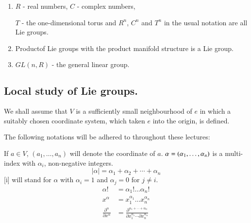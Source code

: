 \begin{enumerate}
\renewcommand{\labelenumi}{(\theenumi)}
\item  $R$ - real numbers, $C$ - complex numbers,

$T$ - the one-dimensional torus and $R^n$, $C^n$ and $T^n$ in the
  usual notation are all Lie groups. 

\item  Product\pageoriginale of Lie groups with the product manifold
  structure is a Lie group. 

\item  $GL(n, R)$ - the general linear group.
\end{enumerate}

\subsection{Local study of Lie groups.}\label{chap2-sec2.2}%

We shall assume that $V$ is a sufficiently small neighbourhood of $e$
in which a suitably chosen coordinate system, which taken $e$ into the
origin, is defined. 

The following notations will be adhered to throughout these lectures:

If $a \in V$, $(a_1,\ldots,a_n)$ will denote the coordinate of
$a$. $\alpha =(\alpha_1,\ldots,\break\alpha_n)$ is a multi-index with
$\alpha_i$, non-negative integers.  
$$
|\alpha|=\alpha_1+\alpha_2+ \cdots + \alpha_n
$$ 
[i] will stand for $\alpha$ with $\alpha_i =1$ and $\alpha_j=0$ for $j\neq i$. 
\begin{align*}
\alpha ! & = \alpha_1 ! \ldots \alpha_n !\\
x^{\alpha}  &= x_1^{\alpha_1} \ldots x_n^{\alpha_n}\\
\frac{\partial^\alpha}{\partial x^\alpha}  &=
\frac{\partial^{\alpha_1+ \cdots + \alpha_n}}{\partial x_1^{\alpha_1}
  \cdots \partial x_n^{\alpha_n}} 
\end{align*}

